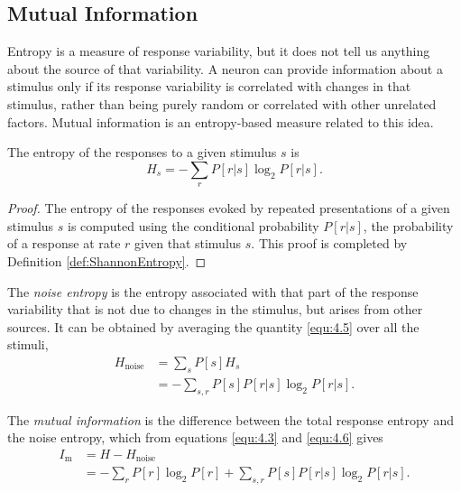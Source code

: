 \subsection{Mutual Information}
\begin{rem}
  Entropy is a measure of response variability, but it does not tell us anything about the source of that variability. A neuron can provide information about a stimulus only if its response variability is correlated with changes in that stimulus, rather than being purely random or correlated with other unrelated factors. Mutual information is an entropy-based measure related to this idea.
\end{rem}

\begin{thm}
  \label{thm:entropy of the responses to a given stimulus}
  The entropy of the responses to a given stimulus $s$ is
  \begin{equation}
    \label{equ:4.5}
    H_s=-\sum\limits_rP[r|s]\log_2P[r|s].
  \end{equation}
\end{thm}
\begin{proof}
  The entropy of the responses evoked by repeated presentations of a given stimulus $s$ is computed using the conditional probability $P[r|s]$, the probability of a response at rate $r$ given that stimulus $s$. This proof is completed by Definition \ref{def:ShannonEntropy}.
\end{proof}

\begin{defn}
  \label{defn:noise entropy}
  The \emph{noise entropy} is the entropy associated with that part of the response variability that is not due to changes in the stimulus, but arises from other sources. It can be obtained by averaging the quantity \ref{equ:4.5} over all the stimuli,
  \begin{equation}
    \begin{aligned}
      \label{equ:4.6}
      H_{\text{noise}}&=\sum_s{P[s]H_s}\\
      &=-\sum\limits_{s,r}{P[s]P[r|s]\log_2{P[r|s]}}.
    \end{aligned}
  \end{equation}
\end{defn}

\begin{defn}
  \label{defn:mutual-information}
  The \emph{mutual information} is the difference between the total response entropy and the noise entropy, which from equations \ref{equ:4.3} and \ref{equ:4.6} gives
  \begin{equation}
    \begin{aligned}
      \label{equ:4.7}
      I_{\text{m}}&=H-H_{\text{noise}}\\
      &=-\sum\limits_{r}{P[r]\log_2P[r]+\sum\limits_{s,r}P[s]P[r|s]\log_2P[r|s]}.
    \end{aligned}
  \end{equation}
\end{defn}

